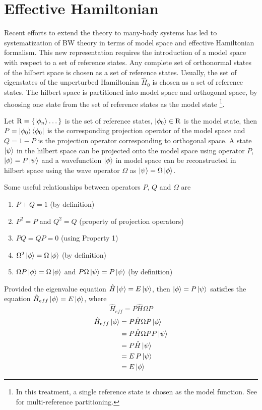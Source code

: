 \section{Effective Hamiltonian}
Recent efforts to extend the theory to many-body systems has led to systematization of BW theory in 
terms of model space and effective Hamiltonian formalism. This new representation requires the
introduction of a model space with respect to a set of reference states. Any complete set of orthonormal states of the hilbert space 
is chosen as a set of reference states. Usually, the set of eigenstates of the unperturbed Hamiltonian $\hat{H}_{0}$ is chosen as a set of 
reference states. The hilbert space is partitioned into model space and orthogonal space, by choosing one state from the set of
reference states as the model state \footnote{In this treatment, a single reference state is chosen as the model function. See 
\cite{wilson2009brillouin} for multi-reference partitioning.}.

Let $\mathrm{R}\equiv\{\ket{\phi_n}\dots\}$ is the set of reference states, $\ket{\phi_0} \in \mathrm{R}$ is the model state, 
then $P = \ket{\phi_0}\bra{\phi_0}$ is the corresponding projection operator of the model space and $Q = \mathrm{1} - P$ is the
projection operator corresponding to orthogonal space. A state $\ket{\psi}$ in the hilbert space can be projected onto the model 
space using operator $P$, $\ket{\phi} = P\ket{\psi}$ and a wavefunction $\ket{\phi}$ in model space can be reconstructed in hilbert
space using the wave operator $\Omega$ as $\ket{\psi} = \Omega\ket{\phi}$.

Some useful relationships between operators $P$, $Q$ and $\Omega$ are 
\begin{enumerate}
 \item $P + Q = \mathrm{1}$ (by definition)
 \item $P^2 = P$ and $Q^2 = Q$ (property of projection operators)
 \item $PQ = QP = 0$ (using Property 1)
 \item $\Omega^2\ket{\phi} = \Omega\ket{\phi}$ (by definition)
 \item $\Omega P \ket{\phi} = \Omega \ket{\phi}$ and $P\Omega \ket{\psi} = P \ket{\psi}$ (by definition)
\end{enumerate}

Provided the eigenvalue equation
$\hat{H}\ket{\psi} = E\ket{\psi}$, then $\ket{\phi} = P\ket{\psi}$ satisfies the equation 
$\hat{H}_{eff}\ket{\phi} = E\ket{\phi}$, where 
\begin{equation}
  \hat{H}_{eff} = P\hat{H}\Omega P
\end{equation}
\begin{align*}
 \hat{H}_{eff}\ket{\phi} &= P\hat{H}\Omega P \ket{\phi} \\
 &= P\hat{H}\Omega P P\ket{\psi} \\
 &= P\hat{H}\ket{\psi} \\
 &= E\,P\ket{\psi} \\
 &= E\ket{\phi}
\end{align*}

